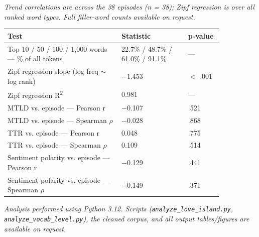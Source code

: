 \documentclass[11pt]{article}
\begin{document}
\emph{Trend correlations are across the 38 episodes (n = 38); Zipf regression is over all ranked word types. Full filler-word counts available on request.}

\begin{center}
\begin{tabular}{p{0.534\linewidth}p{0.316\linewidth}l}
\toprule
Test & Statistic & p-value \\
\midrule
Top 10 / 50 / 100 / 1,000 words --- \% of all tokens & 22.7\% / 48.7\% / 61.0\% / 91.1\% & --- \\
Zipf regression slope (log freq $\sim$ log rank) & $-$1.453 & $<$ .001 \\
Zipf regression R\textsuperscript{2} & 0.981 & --- \\
MTLD vs. episode --- Pearson r & $-$0.107 & .521 \\
MTLD vs. episode --- Spearman $\rho$ & $-$0.028 & .868 \\
TTR vs. episode --- Pearson r & 0.048 & .775 \\
TTR vs. episode --- Spearman $\rho$ & 0.109 & .514 \\
Sentiment polarity vs. episode --- Pearson r & $-$0.129 & .441 \\
Sentiment polarity vs. episode --- Spearman $\rho$ & $-$0.149 & .371 \\
\bottomrule
\end{tabular}
\end{center}


\emph{Analysis performed using Python 3.12. Scripts (\texttt{analyze\_love\_island.py}, \texttt{analyze\_vocab\_level.py}), the cleaned corpus, and all output tables/figures are available on request.}
\end{document}
